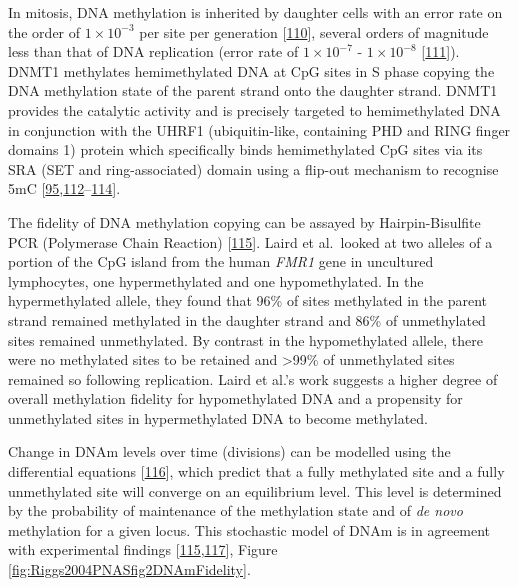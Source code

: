 \documentclass[
]{book}
\begin{document}
In mitosis, DNA methylation is inherited by daughter cells with an error rate on the order of \(1\times10^{-3}\) per site per generation {[}\protect\hyperlink{ref-Ushijima2005}{110}{]}, several orders of magnitude less than that of DNA replication (error rate of \(1\times10^{-7}\) - \(1\times10^{-8}\) {[}\protect\hyperlink{ref-Kunkel2004a}{111}{]}).
DNMT1 methylates hemimethylated DNA at CpG sites in S phase copying the DNA methylation state of the parent strand onto the daughter strand.
DNMT1 provides the catalytic activity and is precisely targeted to hemimethylated DNA in conjunction with the UHRF1 (ubiquitin-like, containing PHD and RING finger domains 1) protein which specifically binds hemimethylated CpG sites via its SRA (SET and ring-associated) domain using a flip-out mechanism to recognise 5mC
{[}\protect\hyperlink{ref-Bostick2007}{95},\protect\hyperlink{ref-Sharif2007}{112}--\protect\hyperlink{ref-Liu2013b}{114}{]}.

The fidelity of DNA methylation copying can be assayed by Hairpin-Bisulfite PCR (Polymerase Chain Reaction) {[}\protect\hyperlink{ref-Laird2004}{115}{]}.
Laird et al.~looked at two alleles of a portion of the CpG island from the human \emph{FMR1} gene in uncultured lymphocytes, one hypermethylated and one hypomethylated.
In the hypermethylated allele, they found that 96\% of sites methylated in the parent strand remained methylated in the daughter strand and 86\% of unmethylated sites remained unmethylated.
By contrast in the hypomethylated allele, there were no methylated sites to be retained and \textgreater99\% of unmethylated sites remained so following replication.
Laird et al.'s work suggests a higher degree of overall methylation fidelity for hypomethylated DNA and a propensity for unmethylated sites in hypermethylated DNA to become methylated.

Change in DNAm levels over time (divisions) can be modelled using the differential equations {[}\protect\hyperlink{ref-Pfeifer1990a}{116}{]}, which predict that a fully methylated site and a fully unmethylated site will converge on an equilibrium level.
This level is determined by the probability of maintenance of the methylation state and of \emph{de novo} methylation for a given locus.
This stochastic model of DNAm is in agreement with experimental findings {[}\protect\hyperlink{ref-Laird2004}{115},\protect\hyperlink{ref-Riggs2004a}{117}{]}, Figure \ref{fig:Riggs2004PNASfig2DNAmFidelity}.
\end{document}
